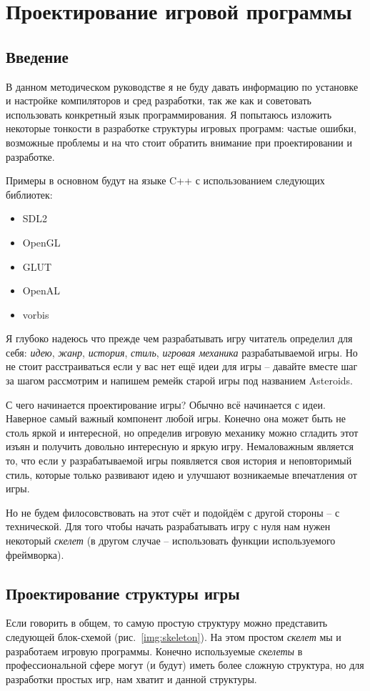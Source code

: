 \chapter{Проектирование игровой программы}
\section{Введение}

В данном методическом руководстве я не буду давать информацию по установке и настройке компиляторов и 
сред разработки, так же как и советовать использовать конкретный язык программирования. Я попытаюсь 
изложить некоторые тонкости в разработке структуры игровых программ: частые ошибки, возможные проблемы и 
на что стоит обратить внимание при проектировании и разработке.

Примеры в основном будут на языке C++ с использованием следующих библиотек:
\begin{itemize}
    \item SDL2
    \item OpenGL
    \item GLUT
    \item OpenAL
    \item vorbis
\end{itemize}

Я глубоко надеюсь что прежде чем разрабатывать игру читатель определил для себя: \emph{идею}, \emph{жанр}, 
\emph{история}, \emph{стиль}, \emph{игровая механика} разрабатываемой игры. Но не стоит расстраиваться если 
у вас нет ещё идеи для игры -- давайте вместе шаг за шагом рассмотрим и напишем ремейк старой игры под 
названием Asteroids.

С чего начинается проектирование игры? Обычно всё начинается с идеи. Наверное самый важный компонент 
любой игры. Конечно она может быть не столь яркой и интересной, но определив игровую механику можно 
сгладить этот изъян и получить довольно интересную и яркую игру. Немаловажным является то, что если у 
разрабатываемой игры появляется своя история и неповторимый стиль, которые только развивают идею и 
улучшают возникаемые впечатления от игры.

Но не будем филосовствовать на этот счёт и подойдём с другой стороны -- с технической. Для того чтобы начать
разрабатывать игру с нуля нам нужен некоторый \emph{скелет} (в другом случае -- использовать функции 
используемого фреймворка).

\pagebreak

\section{Проектирование структуры игры}
Если говорить в общем, то самую простую структуру можно представить следующей блок-схемой 
(рис.~\ref{img:skeleton}). На этом простом \emph{скелет} мы и разработаем игровую программы. Конечно 
используемые \emph{скелеты} в профессиональной сфере могут (и будут) иметь более сложную структура, но 
для разработки простых игр, нам хватит и данной структуры.

